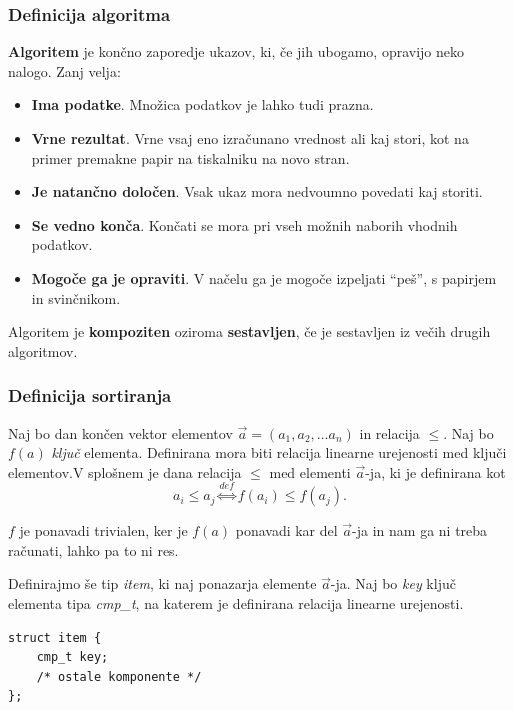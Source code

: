 \documentclass[a4paper,oneside]{article}
\begin{document}
\subsubsection{Definicija algoritma}


\textbf{Algoritem} je končno zaporedje ukazov, ki, če jih ubogamo, opravijo neko nalogo.
Zanj velja:
\begin{itemize}
  \item \textbf{Ima podatke}. Množica podatkov je lahko tudi prazna.
  \item \textbf{Vrne rezultat}. Vrne vsaj eno izračunano vrednost ali kaj stori, kot na primer
    premakne papir na tiskalniku na novo stran.
  \item \textbf{Je natančno določen}. Vsak ukaz mora nedvoumno povedati kaj storiti.
  \item \textbf{Se vedno konča}. Končati se mora pri vseh možnih naborih vhodnih podatkov.
  \item \textbf{Mogoče ga je opraviti}. V načelu ga je mogoče izpeljati ``peš'', s papirjem in
    svinčnikom.
\end{itemize}


\begin{definicija}
  Algoritem je \textbf{kompoziten} oziroma \textbf{sestavljen}, če je sestavljen iz večih
  drugih algoritmov.
\end{definicija}


\subsubsection{Definicija sortiranja}
Naj bo dan končen vektor elementov $\vec{a} = \left(a_1, a_2, \ldots a_n \right)$ in relacija $\leq$.
Naj bo $f(a)$ \emph{ključ} elementa. Definirana mora biti relacija linearne urejenosti med 
ključi elementov.V splošnem je dana relacija $\leq$ med elementi $\vec{a}$-ja, ki je definirana kot 
\[a_i \leq a_j \overset{def}{\Longleftrightarrow} f(a_i) \leq f(a_j). \]

$f$ je ponavadi trivialen, ker je $f(a)$ ponavadi kar del $\vec{a}$-ja in nam ga ni treba
računati, lahko pa to ni res. 

Definirajmo še tip \emph{item}, ki naj ponazarja elemente $\vec{a}$-ja. Naj bo \emph{key}
ključ elementa tipa \emph{cmp\_t}, na katerem je definirana relacija linearne urejenosti.

\begin{lstlisting}
struct item {
    cmp_t key;
    /* ostale komponente */
};
\end{lstlisting}
\end{document}
